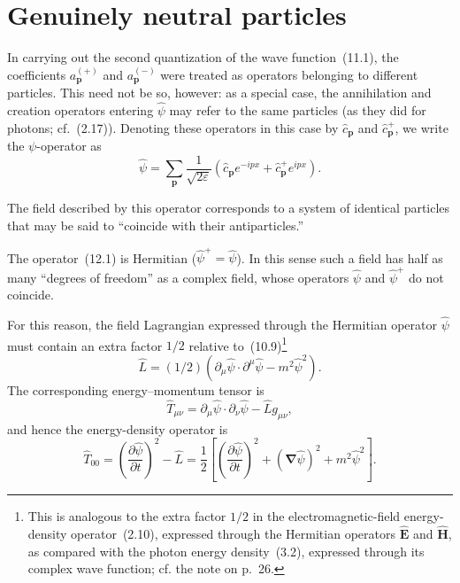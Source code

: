 
\section{Genuinely neutral particles}

In carrying out the second quantization of the wave function~(11.1), the coefficients $a_{\mathbf p}^{(+)}$ and $a_{\mathbf p}^{(-)}$ were treated as operators belonging to different particles. This need not be so, however: as a special case, the annihilation and creation operators entering $\widehat\psi$ may refer to the same particles (as they did for photons; cf.~(2.17)). Denoting these operators in this case by $\widehat c_{\mathbf p}$ and $\widehat c^+_{\mathbf p}$, we write the $\psi$-operator as
\begin{equation}
\widehat\psi=\sum_{\mathbf p}\frac{1}{\sqrt{2\varepsilon}}
\left(\widehat c_{\mathbf p}e^{-ipx}
+\widehat c^+_{\mathbf p}e^{ipx}\right).
\tag{12.1}
\end{equation}

The field described by this operator corresponds to a system of identical particles that may be said to ``coincide with their antiparticles.''

The operator~(12.1) is Hermitian ($\widehat\psi^+=\widehat\psi$). In this sense such a field has half as many ``degrees of freedom'' as a complex field, whose operators $\widehat\psi$ and $\widehat\psi^+$ do not coincide.

For this reason, the field Lagrangian expressed through the Hermitian operator $\widehat\psi$ must contain an extra factor $1/2$ relative to~(10.9)\footnote{This is analogous to the extra factor $1/2$ in the electromagnetic-field energy-density operator~(2.10), expressed through the Hermitian operators $\widehat{\mathbf E}$ and $\widehat{\mathbf H}$, as compared with the photon energy density~(3.2), expressed through its complex wave function; cf. the note on p.~26.}
\begin{equation}
\widehat L=(1/2)\left(\partial_\mu\widehat\psi\cdot
\partial^\mu\widehat\psi-m^2\widehat\psi^2\right).
\tag{12.2}
\end{equation}
The corresponding energy--momentum tensor is
\begin{equation}
\widehat T_{\mu\nu}=\partial_\mu\widehat\psi\cdot
\partial_\nu\widehat\psi-\widehat Lg_{\mu\nu},
\tag{12.3}
\end{equation}
and hence the energy-density operator is
\begin{equation}
\widehat T_{00}=\left(\frac{\partial\widehat\psi}{\partial t}\right)^2
-\widehat L
=\frac{1}{2}\left[
\left(\frac{\partial\widehat\psi}{\partial t}\right)^2
+(\boldsymbol\nabla\widehat\psi)^2+m^2\widehat\psi^2
\right].
\tag{12.4}
\end{equation}

